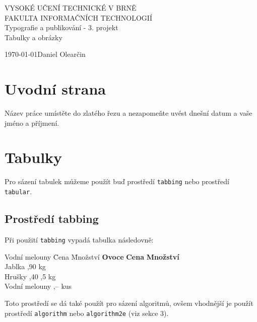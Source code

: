 \documentclass[a4paper, 11pt, column] {article}
\begin{document}
	\begin{titlepage}
		\begin{center}
			\huge{VYSOKÉ UČENÍ TECHNICKÉ V BRNĚ}\\
			\LARGE{FAKULTA INFORMAČNÍCH TECHNOLOGIÍ}\\
			\Large{Typografie a publikování - 3. projekt}\\
			\huge{Tabulky a obrázky}\\
		\end{center}
		\Large{\today \hfill Daniel Olearčin}
	\end{titlepage}
\setcounter{page}{1}

\section{Uvodní strana}
Název práce umístěte do zlatého řezu a nezapomeňte uvést dnešní datum a vaše jméno a příjmení.

\section{Tabulky}
Pro sázení tabulek můžeme použít buď prostředí \verb|tabbing| nebo prostředí \verb|tabular|.

\subsection{Prostředí tabbing}
Při použití \verb|tabbing| vypadá tabulka následovně:
\begin{tabbing}
    Vodní melouny \quad \= Cena \quad \= Množství \kill
    \textbf{Ovoce} \> \textbf{Cena} \> \textbf{Množství} \\
    Jablka ,90  kg \\
    Hrušky ,40 ,5 kg \\
    Vodní melouny ,--  kus \\
\end{tabbing}
Toto prostředí se dá také použít pro sázení algoritmů, ovšem vhodnější je použít 
prostředí \verb|algorithm| nebo \verb|algorithm2e| (viz sekce 3).
\end{document}
